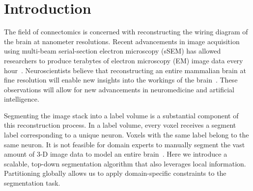 \section{Introduction}

The field of connectomics is concerned with reconstructing the wiring diagram of the brain at nanometer resolutions. 
Recent advancements in image acquisition using multi-beam serial-section electron microscopy (sSEM) has allowed researchers to produce terabytes of electron microscopy (EM) image data every hour~\cite{hildebrand2017whole}.
Neuroscientists believe that reconstructing an entire mammalian brain at fine resolution will enable new insights into the workings of the brain~\cite{kasthuri2015saturated,haehn2017scalable}. 
These observations will allow for new advancements in neuromedicine and artificial intelligence. 

Segmenting the image stack into a label volume is a substantial component of this reconstruction process.
In a label volume, every voxel receives a segment label corresponding to a unique neuron. 
Voxels with the same label belong to the same neuron.
It is not feasible for domain experts to manually segment the vast amount of 3-D image data to model an entire brain~\cite{haehn2014design}.
Here we introduce a scalable, top-down segmentation algorithm that also leverages local information.
Partitioning globally allows us to apply domain-specific constraints to the segmentation task.

